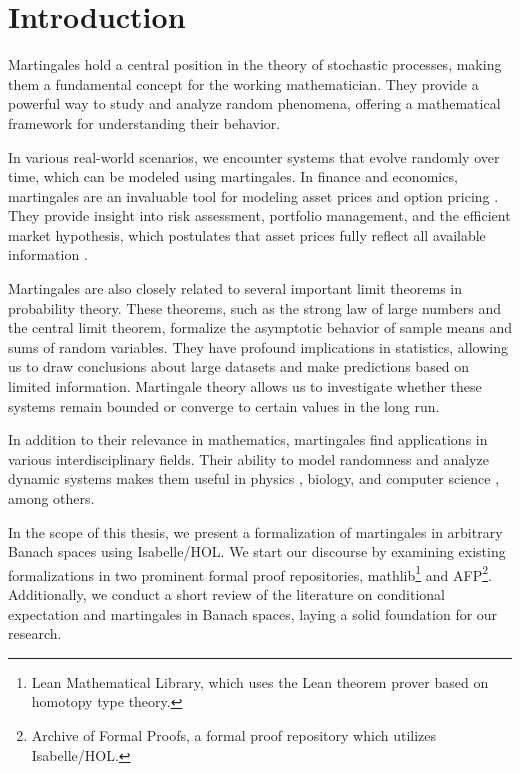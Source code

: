﻿%

\chapter{Introduction}\label{chapter:introduction}

Martingales hold a central position in the theory of stochastic processes, making them a fundamental concept for the working mathematician. They provide a powerful way to study and analyze random phenomena, offering a mathematical framework for understanding their behavior. 

In various real-world scenarios, we encounter systems that evolve randomly over time, which can be modeled using martingales. In finance and economics, martingales are an invaluable tool for modeling asset prices \cite{fama1965} and option pricing \cite{Musiela_Rutkowski_2005}. They provide insight into risk assessment, portfolio management, and the efficient market hypothesis, which postulates that asset prices fully reflect all available information \cite{yaes1989}. 

Martingales are also closely related to several important limit theorems in probability theory. These theorems, such as the strong law of large numbers and the central limit theorem, formalize the asymptotic behavior of sample means and sums of random variables. They have profound implications in statistics, allowing us to draw conclusions about large datasets and make predictions based on limited information. Martingale theory allows us to investigate whether these systems remain bounded or converge to certain values in the long run.

In addition to their relevance in mathematics, martingales find applications in various interdisciplinary fields. Their ability to model randomness and analyze dynamic systems makes them useful in physics \cite{roldan2023}, biology, and computer science \cite{mitzenmacher_upfal_2005}, among others.

In the scope of this thesis, we present a formalization of martingales in arbitrary Banach spaces using Isabelle/HOL. We start our discourse by examining existing formalizations in two prominent formal proof repositories, \textsf{mathlib}\footnote{Lean Mathematical Library, which uses the Lean theorem prover based on homotopy type theory.}  and \textsf{AFP}\footnote{Archive of Formal Proofs, a formal proof repository which utilizes  Isabelle/HOL.}. Additionally, we conduct a short review of the literature on conditional expectation and martingales in Banach spaces, laying a solid foundation for our research.

